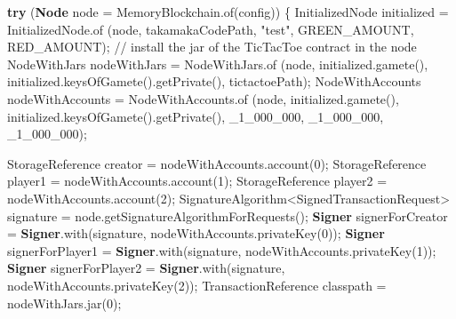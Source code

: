 \documentclass[a4paper,]{book}
\newenvironment{Shaded}{\begin{snugshade}}{\end{snugshade}}
\newcommand{\BuiltInTok}[1]{\textcolor[rgb]{0.39,0.29,0.61}{\textbf{#1}}}
\newcommand{\CommentTok}[1]{\textcolor[rgb]{0.54,0.53,0.53}{#1}}
\newcommand{\DecValTok}[1]{\textcolor[rgb]{0.69,0.50,0.00}{#1}}
\newcommand{\FunctionTok}[1]{\textcolor[rgb]{0.39,0.29,0.61}{#1}}
\newcommand{\KeywordTok}[1]{\textcolor[rgb]{0.12,0.11,0.11}{\textbf{#1}}}
\newcommand{\NormalTok}[1]{\textcolor[rgb]{0.12,0.11,0.11}{#1}}
\newcommand{\StringTok}[1]{\textcolor[rgb]{0.75,0.01,0.01}{#1}}
\renewenvironment{Shaded}{\begin{snugshade}\small}{\end{snugshade}}
\begin{document}
{\begin{Shaded}
\begin{Highlighting}[]
    \KeywordTok{try}\NormalTok{ (}\BuiltInTok{Node}\NormalTok{ node = MemoryBlockchain.}\FunctionTok{of}\NormalTok{(config)) \{}
\NormalTok{      InitializedNode initialized = InitializedNode.}\FunctionTok{of}
\NormalTok{        (node, takamakaCodePath, }\StringTok{"test"}\NormalTok{, GREEN_AMOUNT, RED_AMOUNT);}
      \CommentTok{// install the jar of the TicTacToe contract in the node}
\NormalTok{      NodeWithJars nodeWithJars = NodeWithJars.}\FunctionTok{of}
\NormalTok{        (node, initialized.}\FunctionTok{gamete}\NormalTok{(), initialized.}\FunctionTok{keysOfGamete}\NormalTok{().}\FunctionTok{getPrivate}\NormalTok{(),}
\NormalTok{         tictactoePath);}
\NormalTok{      NodeWithAccounts nodeWithAccounts = NodeWithAccounts.}\FunctionTok{of}
\NormalTok{        (node, initialized.}\FunctionTok{gamete}\NormalTok{(), initialized.}\FunctionTok{keysOfGamete}\NormalTok{().}\FunctionTok{getPrivate}\NormalTok{(),}
\NormalTok{        _}\DecValTok{1_000_000}\NormalTok{, _}\DecValTok{1_000_000}\NormalTok{, _}\DecValTok{1_000_000}\NormalTok{);}

\NormalTok{      StorageReference creator = nodeWithAccounts.}\FunctionTok{account}\NormalTok{(}\DecValTok{0}\NormalTok{);}
\NormalTok{      StorageReference player1 = nodeWithAccounts.}\FunctionTok{account}\NormalTok{(}\DecValTok{1}\NormalTok{);}
\NormalTok{      StorageReference player2 = nodeWithAccounts.}\FunctionTok{account}\NormalTok{(}\DecValTok{2}\NormalTok{);}
\NormalTok{      SignatureAlgorithm<SignedTransactionRequest> signature}
\NormalTok{        = node.}\FunctionTok{getSignatureAlgorithmForRequests}\NormalTok{();}
      \BuiltInTok{Signer}\NormalTok{ signerForCreator = }\BuiltInTok{Signer}\NormalTok{.}\FunctionTok{with}\NormalTok{(signature, nodeWithAccounts.}\FunctionTok{privateKey}\NormalTok{(}\DecValTok{0}\NormalTok{));}
      \BuiltInTok{Signer}\NormalTok{ signerForPlayer1 = }\BuiltInTok{Signer}\NormalTok{.}\FunctionTok{with}\NormalTok{(signature, nodeWithAccounts.}\FunctionTok{privateKey}\NormalTok{(}\DecValTok{1}\NormalTok{));}
      \BuiltInTok{Signer}\NormalTok{ signerForPlayer2 = }\BuiltInTok{Signer}\NormalTok{.}\FunctionTok{with}\NormalTok{(signature, nodeWithAccounts.}\FunctionTok{privateKey}\NormalTok{(}\DecValTok{2}\NormalTok{));}
\NormalTok{      TransactionReference classpath = nodeWithJars.}\FunctionTok{jar}\NormalTok{(}\DecValTok{0}\NormalTok{);}


\end{Highlighting}
\end{Shaded}}
\end{document}
